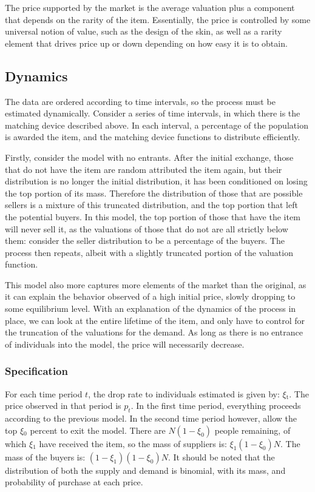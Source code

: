 \documentclass[12pt, letterpaper]{paper}
\begin{document}
The price supported by the market is the average
valuation plus a component that depends on the rarity of the
item. Essentially, the price is controlled by some
universal notion of value, such as the design of the skin, as well as
a rarity element that drives price up or down depending on how easy it
is to obtain.

\subsection{Dynamics}
\label{sec-2-2}
The data are ordered according to time intervals, so the process must
be estimated dynamically. Consider a series of time intervals, in
which there is the matching device described above. In each interval, a percentage of
the population is awarded the item, and the matching device functions
to distribute efficiently.

Firstly, consider the model with no entrants. After the initial
exchange, those that do not have the item are random attributed the
item again, but their distribution is no longer the initial
distribution, it has been conditioned on losing the top portion of its
mass. Therefore the distribution of those that are possible sellers is
a mixture of this truncated distribution, and the top portion that
left the potential buyers. In this model, the top portion of
those that have the item will never sell it, as the valuations of
those that do not are all strictly below them: consider the
seller distribution to be a percentage of the buyers. The process then
repeats, albeit with a slightly truncated portion of the valuation
function. 

This model also more captures more elements of the market than the
original, as it can explain the behavior observed of a high initial
price, slowly dropping to some equilibrium level. With an explanation
of the dynamics of the process in place, we can look at the entire
lifetime of the item, and only have to control for the truncation of
the valuations for the demand. As long as there is no entrance of
individuals into the model, the price will necessarily decrease.


\subsubsection{Specification}
\label{sec-2-2-1}

For each time period $t$, the drop rate to individuals estimated is
given by: $\xi$$_{\text{t}}$. The price observed in that period is $p_t$. In the first
time period, everything proceeds according to the previous
model. In the second time period however, allow the top $\xi$$_{\text{0}}$ percent to
exit the model. There are $N(1-\xi_0)$ people remaining, of which $\xi$$_{\text{1}}$ have
received the item, so the mass of suppliers is: $\xi_1 (1-\xi_0)N$. The mass
of the buyers is: $(1-\xi_1)(1-\xi_0)N$. It should be noted that the
distribution of both the supply and demand is binomial, with its mass,
and probability of purchase at each price.
\end{document}
